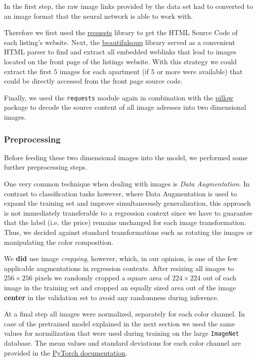 \documentclass[12pt, letterpaper]{article}
\begin{document}
In the first step, the raw image links provided by the data set had to converted to an image format that the neural network is able to work with.

Therefore we first used the \href{https://docs.python-requests.org/en/latest/}{requests} library to get the HTML Source Code of each listing's website.
Next, the \href{https://beautiful-soup-4.readthedocs.io/en/latest/}{beautifulsoup} library served as a convenient HTML parser to find and extract all embedded weblinks that lead to images located on the front page of the listings website.
With this strategy we could extract the first $5$ images for each apartment (if $5$ or more were available) that could be directly accessed from the front page source code.

Finally, we used the \texttt{requests} module again in combination with the \href{https://pillow.readthedocs.io/en/stable/}{pillow} package to decode the source content of all image adresses into two dimensional images.


\subsubsection{Preprocessing}

Before feeding these two dimensional images into the model, we performed some further preprocessing steps.

One very common technique when dealing with images is \emph{Data Augmentation}.
In contrast to classification tasks however, where Data Augmentation is used to expand the training set and improve simultaneously generalization, this approach is not immediately transferable to a regression context since we have to guarantee that the label (i.e. the price) remains unchanged for each image transformation.
Thus, we decided against standard transformations such as rotating the images or manipulating the color composition.

We \textbf{did} use image \emph{cropping}, however, which, in our opinion, is one of the few applicable augmentations in regression contexts.
After resizing all images to $256 \times 256$ pixels we randomly cropped a square area of $224 \times 224$ out of each image in the training set and cropped an equally sized area out of the image \textbf{center} in the validation set to avoid any randomness during inference.

At a final step all images were normalized, separately for each color channel.
In case of the pretrained model explained in the next section we used the same values for normilization that were used during training on the large \texttt{ImageNet} database.
The mean values and standard deviations for each color channel are provided in the \href{https://pytorch.org/vision/stable/models.html}{PyTorch documentation}.
\end{document}
